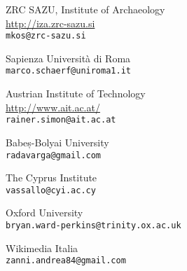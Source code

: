 \begin{contributors}
{  ZRC SAZU, Institute of Archaeology \\
\url{http://iza.zrc-sazu.si}	\\
\texttt{mkos@zrc-sazu.si	}
}


{Sapienza Università di Roma	   \\
\texttt{marco.schaerf@uniroma1.it	}
}
	

{  Austrian Institute of Technology \\
\url{http://www.ait.ac.at/}	\\
\texttt{rainer.simon@ait.ac.at}
}
	
		
		
		

{  Babeș-Bolyai University	 \\
\texttt{radavarga@gmail.com	}
}
		


{  The Cyprus Institute	 \\
\texttt{vassallo@cyi.ac.cy	}
}


{Oxford University	   \\
\texttt{bryan.ward-perkins@trinity.ox.ac.uk}
}



{ Wikimedia Italia	  \\
\texttt{zanni.andrea84@gmail.com}
}



		


\end{contributors}